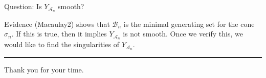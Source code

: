 \documentclass[mathserif,handout]{beamer}
\theoremstyle{plain}
\theoremstyle{definition}
\theoremstyle{remark}
\begin{document}
\begin{frame}%
{}{}
{\color{GTblue}Question:} Is $Y_{\mathscr A_n}$ smooth?

\pause
\vspace{0.75pc}
Evidence (Macaulay2) shows that $\mathscr B_n$ is the minimal generating set for the cone $\sigma_n$.  If this is true, then it implies $Y_{\mathscr A_n}$ is not smooth.  Once we verify this, we would like to find the singularities of $Y_{\mathscr A_n}$.

\pause
\vspace{0.75pc}
\hrule

\pause
\begin{flushright}
{\color{GTtechgold}Thank you for your time.}
\end{flushright}

\end{frame}
\end{document}
